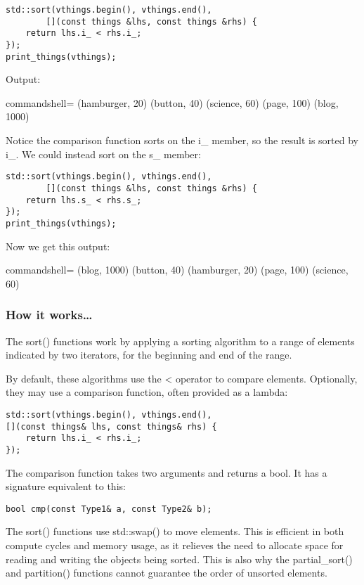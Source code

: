 \begin{itemize}
\begin{lstlisting}[style=styleCXX]
std::sort(vthings.begin(), vthings.end(),
		[](const things &lhs, const things &rhs) {
	return lhs.i_ < rhs.i_;
});
print_things(vthings);
\end{lstlisting}

Output:

\begin{tcblisting}{commandshell={}}
(hamburger, 20) (button, 40) (science, 60) (page, 100)
(blog, 1000)
\end{tcblisting}

Notice the comparison function sorts on the i\_ member, so the result is sorted by i\_. We could instead sort on the s\_ member:

\begin{lstlisting}[style=styleCXX]
std::sort(vthings.begin(), vthings.end(),
		[](const things &lhs, const things &rhs) {
	return lhs.s_ < rhs.s_;
});
print_things(vthings);
\end{lstlisting}

Now we get this output:

\begin{tcblisting}{commandshell={}}
(blog, 1000) (button, 40) (hamburger, 20) (page, 100)
(science, 60)
\end{tcblisting}

\end{itemize}

\subsubsection{How it works…}

The sort() functions work by applying a sorting algorithm to a range of elements indicated by two iterators, for the beginning and end of the range.

By default, these algorithms use the < operator to compare elements. Optionally, they may use a comparison function, often provided as a lambda:

\begin{lstlisting}[style=styleCXX]
std::sort(vthings.begin(), vthings.end(),
[](const things& lhs, const things& rhs) {
	return lhs.i_ < rhs.i_;
});
\end{lstlisting}

The comparison function takes two arguments and returns a bool. It has a signature equivalent to this:

\begin{lstlisting}[style=styleCXX]
bool cmp(const Type1& a, const Type2& b);
\end{lstlisting}

The sort() functions use std::swap() to move elements. This is efficient in both compute cycles and memory usage, as it relieves the need to allocate space for reading and writing the objects being sorted. This is also why the partial\_sort() and partition() functions cannot guarantee the order of unsorted elements.











